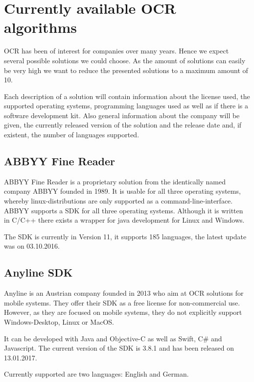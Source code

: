 \section{Currently available OCR algorithms}
\label{sec3.1}

OCR has been of interest for companies over many years. Hence we expect several possible solutions we could choose. As the amount of solutions can easily be very high we want to reduce the presented solutions to a maximum amount of 10.

Each description of a solution will contain information about the license used, the supported operating systems, programming languages used as well as if there is a software development kit. Also general information about the company will be given, the currently released version of the solution and the release date and, if existent, the number of languages supported.

\subsection{ABBYY Fine Reader}
\label{sec3.1.1}

ABBYY Fine Reader is a proprietary solution from the identically named company ABBYY founded in 1989. It is usable for all three operating systems, whereby linux-distributions are only supported as a command-line-interface. ABBYY supports a SDK for all three operating systems. Although it is written in C/C++ there exists a wrapper for java development for Linux and Windows\cite{abbyy16}. 

The SDK is currently in Version 11, it supports 185 languages, the latest update was on 03.10.2016.

\subsection{Anyline SDK}
\label{sec3.1.2}

Anyline is an Austrian company founded in 2013 who aim at OCR solutions for mobile systems. They offer their SDK as a free license for non-commercial use. However, as they are focused on mobile systems, they do not explicitly support Windows-Desktop, Linux or MacOS.

It can be developed with Java and Objective-C as well as Swift, C\# and Javascript. The current version of the SDK is 3.8.1 and has been released on 13.01.2017.

Currently supported are two languages: English and German.


